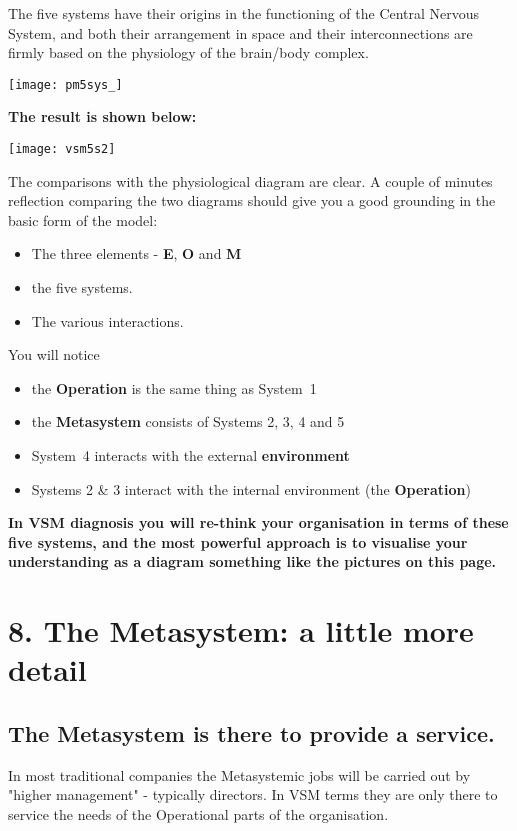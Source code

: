  The five systems have their origins in the functioning of the Central Nervous System, and both their arrangement in space and their interconnections are firmly based on the physiology of the brain/body complex.

 \begin{center}
 	\texttt{[image: pm5sys\_]}
 \end{center}

\textbf{The result is shown below:}

 \begin{center}
	\texttt{[image: vsm5s2]}
\end{center}

The comparisons with the physiological diagram are clear. A couple of minutes reflection comparing the two diagrams should give you a good grounding in the basic form of the model:

\begin{itemize}
	\item The three elements - \textcolor{E}{\textbf{E}}, \textcolor{O}{\textbf{O}} and \textcolor{M}{\textbf{M}}
	\item the five systems.
	\item The various interactions.
\end{itemize}

You will notice
\begin{itemize}
	\item the \textcolor{O}{\textbf{Operation}} is the same thing as System 1
	\item the \textcolor{M}{\textbf{Metasystem}} consists of Systems 2, 3, 4 and 5
	\item System 4 interacts with the external \textcolor{E}{\textbf{environment}}
	\item Systems 2 \& 3 interact with the internal environment (the \textcolor{O}{\textbf{Operation}})
\end{itemize}


\textbf{In VSM diagnosis you will re-think your organisation in terms of these five systems, and the most powerful approach is to visualise your understanding as a diagram something like the pictures on this page.}

\section*{8. The \textcolor{M}{\textbf{Metasystem}}: a little more detail}

\subsection*{The \textcolor{M}{\textbf{Metasystem}} is there to provide a service.}
In most traditional companies the Metasystemic jobs will be carried out by "higher management" - typically directors. In VSM terms they are only there to service the needs of the Operational parts of the organisation.

